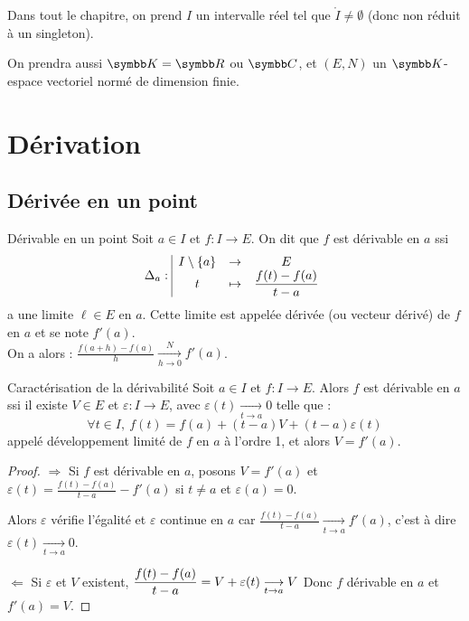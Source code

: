 Dans tout le chapitre, on prend $I$ un intervalle réel tel que $\mathring{I} \neq \emptyset$ (donc non réduit à un singleton).

On prendra aussi $\K = \R$ ou $\C$, et $(E,N)$ un $\K$-espace vectoriel normé
de dimension finie.

\section{Dérivation}
\subsection{Dérivée en un point}

\begin{definition}{Dérivable en un point}{}
    Soit $a \in I$ et $f: I \to E$. On dit que $f$ est dérivable en $a$ ssi 
    \[\Delta_a: \space \begin{array}{|ccc} \displaystyle I \setminus \{a\} & \to & \displaystyle E \\ \displaystyle t & \mapsto & \displaystyle \frac{f(t) - f(a)}{t-a} \end{array}\]
    a une limite $\ell \in E$ en $a$. Cette limite est appelée dérivée (ou vecteur dérivé)
    de $f$ en $a$ et se note $f'(a)$. \\

    On a alors : $\displaystyle \frac{f(a + h ) - f(a)}{h} \xrightarrow[h \to 0]{N} f'(a)$.
\end{definition}

\begin{proposition}{Caractérisation de la dérivabilité}{}
    Soit $a \in I$ et $f: I \to E$. Alors $f$ est dérivable en $a$ ssi il existe $V \in E$
    et $\varepsilon : I \to E$, avec $\varepsilon(t) \xrightarrow[t \to a]{} 0$ telle que :
    \[ \forall t \in I,~f(t) = f(a) + (t-a)V + (t-a)\varepsilon(t)\]
    appelé développement limité de $f$ en $a$ à l'ordre 1, et alors $V = f'(a)$.
\end{proposition}

\begin{proof}
    $\Rightarrow$ Si $f$ est dérivable en $a$, posons $V = f'(a)$ et $\varepsilon(t) = \frac{f(t) - f(a)}{t - a } - f'(a)$ si 
    $t \neq a$ et $\varepsilon(a) = 0$. 

    Alors $\varepsilon$ vérifie l'égalité et $\varepsilon$ continue en $a$ car 
    $\displaystyle \frac{f(t) - f(a)}{t-a} \xrightarrow[t \to a]{} f'(a)$, c'est à dire 
    $\varepsilon(t) \xrightarrow[t \to a]{} 0$.

    $\Leftarrow$ Si $\varepsilon$ et $V$ existent, $\displaystyle \frac{f(t) - f(a)}{t-a} = V + \varepsilon(t) \underset{t \to a}{\longrightarrow} V$
    Donc $f$ dérivable en $a$ et $f'(a) = V$.
\end{proof}

